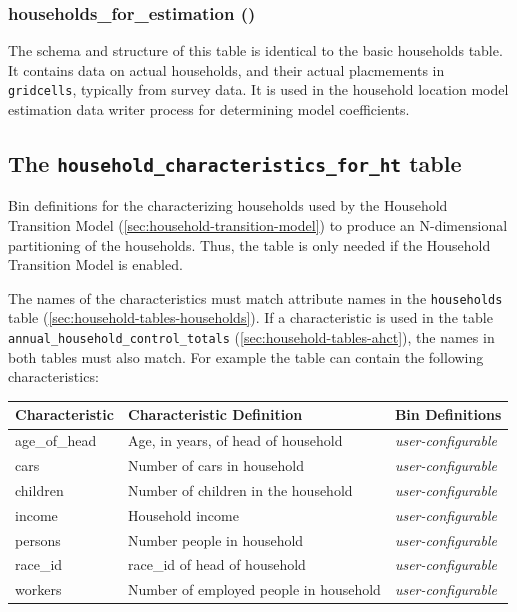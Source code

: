 \subsubsection{households_for_estimation () }

The schema and structure of this table is identical to the basic households
table. It contains data on actual households, and their actual placmements in
\verb|gridcells|, typically from survey data. It is used in the household
location model estimation data writer process for determining model
coefficients.

\subsection{The {\tt household_characteristics_for_ht} table}
\label{sec:household-tables-char-for-ht}

Bin definitions for the characterizing households used by the Household
Transition Model (\ref{sec:household-transition-model})
to produce an N-dimensional partitioning of the households. Thus, the table is only needed if the
Household Transition Model \modelsindex is enabled.

The names of the
characteristics must match
attribute names in the {\tt households} table (\ref{sec:household-tables-households}).
If a characteristic is used in the table {\tt annual_household_control_totals}
(\ref{sec:household-tables-ahct}), the names in both tables must also match.
For example the table can contain the following
characteristics:

\begin{tabular}{|l|p{2in}|p{3in}|}
\hline
\textbf{Characteristic}
&\textbf{Characteristic Definition}
&\textbf{Bin Definitions}
\\
\hline
age_of_head & Age, in years, of head of household  & \emph{user-configurable}
\\
\hline
cars &Number of cars in household & \emph{user-configurable}
\\
\hline
children &Number of children in the household & \emph{user-configurable}
\\
\hline
income &Household income  & \emph{user-configurable}
\\
\hline
persons &Number people in household & \emph{user-configurable}
\\
\hline
race_id &race_id of head of household & \emph{user-configurable}
\\
\hline
workers &Number of employed people in household & \emph{user-configurable}
\\
\hline

\end{tabular}


